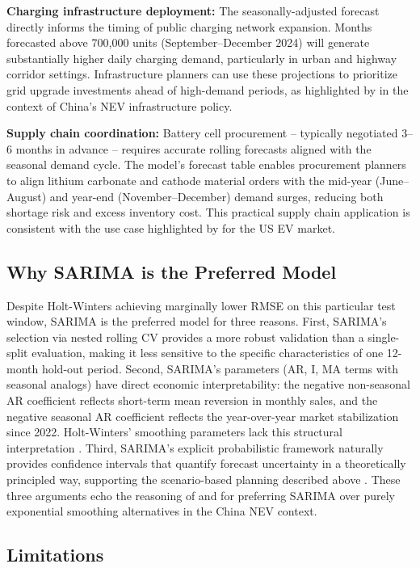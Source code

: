 \documentclass[12pt]{article}
\begin{document}
\textbf{Charging infrastructure deployment:} The seasonally-adjusted forecast directly informs the timing of public charging network expansion. Months forecasted above 700,000 units (September--December 2024) will generate substantially higher daily charging demand, particularly in urban and highway corridor settings. Infrastructure planners can use these projections to prioritize grid upgrade investments ahead of high-demand periods, as highlighted by \citet{chen2025} in the context of China's NEV infrastructure policy.

\textbf{Supply chain coordination:} Battery cell procurement -- typically negotiated 3--6 months in advance -- requires accurate rolling forecasts aligned with the seasonal demand cycle. The model's forecast table enables procurement planners to align lithium carbonate and cathode material orders with the mid-year (June--August) and year-end (November--December) demand surges, reducing both shortage risk and excess inventory cost. This practical supply chain application is consistent with the use case highlighted by \citet{cetin2024} for the US EV market.

\subsection{Why SARIMA is the Preferred Model}

Despite Holt-Winters achieving marginally lower RMSE on this particular test window, SARIMA is the preferred model for three reasons. First, SARIMA's selection via nested rolling CV provides a more robust validation than a single-split evaluation, making it less sensitive to the specific characteristics of one 12-month hold-out period. Second, SARIMA's parameters (AR, I, MA terms with seasonal analogs) have direct economic interpretability: the negative non-seasonal AR coefficient reflects short-term mean reversion in monthly sales, and the negative seasonal AR coefficient reflects the year-over-year market stabilization since 2022. Holt-Winters' smoothing parameters lack this structural interpretation \citep{ge2024}. Third, SARIMA's explicit probabilistic framework naturally provides confidence intervals that quantify forecast uncertainty in a theoretically principled way, supporting the scenario-based planning described above \citep{cetin2024}. These three arguments echo the reasoning of \citet{chen2025} and \citet{liang2025} for preferring SARIMA over purely exponential smoothing alternatives in the China NEV context.

\subsection{Limitations}
\end{document}
